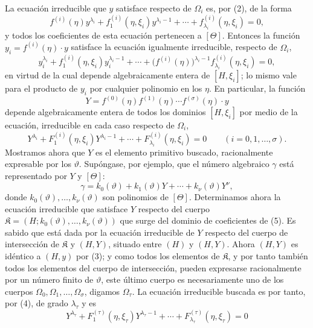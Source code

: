 La ecuación irreducible que $y$ satisface respecto de $\Omega_i$ es, por (2), de la forma
\[
 f^{(i)}(\eta)y^{\lambda_i}+f_1^{(i)}(\eta,\xi_i)y^{\lambda_i-1}
+\cdots+f_{\lambda_i}^{(i)}(\eta,\xi_i)=0,
\]
y todos los coeficientes de esta ecuación pertenecen a $[\Theta]$. Entonces la función $y_i=f^{(i)}(\eta)\cdot y$ satisface la ecuación igualmente irreducible, respecto de $\Omega_i$,
\[
 y_i^{\lambda_i}+f_1^{(i)}(\eta,\xi_i)y_i^{\lambda_i-1}
+\cdots+\bigl(f^{(i)}(\eta)\bigr)^{\lambda_i-1}
 f_{\lambda_i}^{(i)}(\eta,\xi_i)=0,
\]
en virtud de la cual depende algebraicamente entera de $[H,\xi_i]$; lo mismo vale para el producto de $y_i$ por cualquier polinomio en los $\eta$. En particular, la función
\begin{equation}
Y=f^{(0)}(\eta)f^{(1)}(\eta)\cdots f^{(\sigma)}(\eta)\cdot y
\tag{3}
\end{equation}
depende algebraicamente entera de todos los dominios $[H,\xi_i]$ por medio de la ecuación, irreducible en cada caso respecto de $\Omega_i$,
\begin{equation}
Y^{\lambda_i}+F_1^{(i)}(\eta,\xi_i)Y^{\lambda_i-1}
+\cdots+F_{\lambda_i}^{(i)}(\eta,\xi_i)=0
\qquad (i=0,1,\ldots,\sigma).
\tag{4}
\end{equation}
Mostramos ahora que $Y$ es el elemento primitivo buscado, racionalmente expresable por los $\vartheta$. Supóngase, por ejemplo, que el número algebraico $\gamma$ está representado por $Y$ y $[\Theta]$:
\begin{equation}
\gamma=k_0(\vartheta)+k_1(\vartheta)Y+\cdots+k_\nu(\vartheta)Y^\nu,
\tag{5}
\end{equation}
donde $k_0(\vartheta),\ldots,k_\nu(\vartheta)$ son polinomios de $[\Theta]$. Determinamos ahora la ecuación irreducible que satisface $Y$ respecto del cuerpo
$\mathfrak K=(H;k_0(\vartheta),\ldots,k_\nu(\vartheta))$ que surge del dominio de coeficientes de (5). Es sabido que está dada por la ecuación irreducible de $Y$ respecto del cuerpo de intersección de $\mathfrak K$ y $(H,Y)$, situado entre $(H)$ y $(H,Y)$. Ahora $(H,Y)$ es idéntico a $(H,y)$ por (3); y como todos los elementos de $\mathfrak K$, y por tanto también todos los elementos del cuerpo de intersección, pueden expresarse racionalmente por un número finito de $\vartheta$, este último cuerpo es necesariamente uno de los cuerpos $\Omega_0,\Omega_1,\ldots,\Omega_\sigma$, digamos $\Omega_\tau$. La ecuación irreducible buscada es por tanto, por (4), de grado $\lambda_\tau$ y es
\begin{equation}
Y^{\lambda_\tau}+F_1^{(\tau)}(\eta,\xi_\tau)Y^{\lambda_\tau-1}
+\cdots+F_{\lambda_\tau}^{(\tau)}(\eta,\xi_\tau)=0
\tag{6}
\end{equation}
